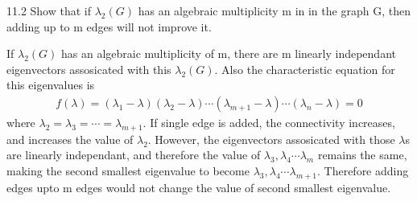 \documentclass{article}
\begin{document}
\begin{problem}
    11.2 Show that if $\lambda_2(G)$ has an algebraic multiplicity m in in the graph G, then adding up to m edges will not improve it. 

    If $\lambda_2 (G)$ has an algebraic multiplicity of m, there are m linearly independant eigenvectors assosicated with this $\lambda_2(G)$. Also the characteristic equation for this eigenvalues is 
    \begin{align*}
        f(\lambda) = (\lambda_1 -\lambda)(\lambda_2 - \lambda) \cdots (\lambda_{m+1} - \lambda) \cdots (\lambda_n - \lambda) = 0
    \end{align*}
    where $\lambda_2 = \lambda_3 = \cdots = \lambda_{m+1}$. If single edge is added, the connectivity increases, and increases the value of $\lambda_2$. However, the eigenvectors assosicated with those $\lambda$s are linearly independant, and therefore the value of $\lambda_3, \lambda_4 \cdots \lambda_m$ remains the same, making the second smallest eigenvalue to become $\lambda_3, \lambda_4 \cdots \lambda_{m+1}$. Therefore adding edges upto m edges would not change the value of second smallest eigenvalue.  
\end{problem}
\end{document}

